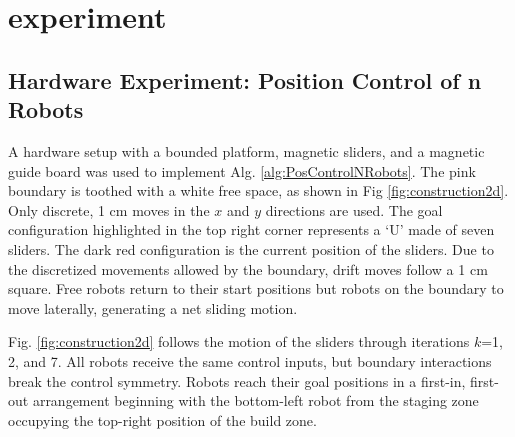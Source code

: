 
\section{experiment}\label{sec:expResults}

\subsection{Hardware Experiment: Position Control of n Robots}
A hardware setup with a bounded platform, magnetic sliders, and a magnetic guide board was used to implement  Alg. \ref{alg:PosControlNRobots}. 
  The pink boundary is toothed with a white free space, as shown in Fig \ref{fig:construction2d}.
    Only discrete, 1 cm moves in the $x$ and $y$ directions are used. The goal configuration highlighted in the top right corner represents a `U' made of seven sliders. The dark red configuration is the current position of the sliders. 
Due to the discretized movements allowed by the boundary, drift moves follow a 1 cm square.  Free robots return to their start positions but robots on the boundary to move laterally, generating a net sliding motion.

Fig. \ref{fig:construction2d} follows the motion of the sliders through iterations  $k$=1, 2, and 7. All robots receive the same control inputs, but boundary interactions break the control symmetry.  Robots reach their goal positions in a first-in, first-out arrangement beginning with the bottom-left robot from the staging zone occupying the top-right position of the build zone.

